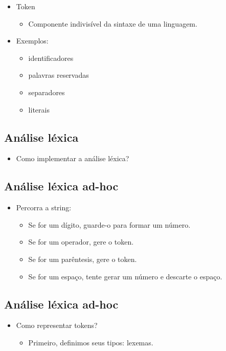 \documentclass[11pt]{article}
\begin{document}
\begin{itemize}
\item Token
\begin{itemize}
\item Componente indivisível da sintaxe de uma linguagem.
\end{itemize}
\item Exemplos:
\begin{itemize}
\item identificadores
\item palavras reservadas
\item separadores
\item literais
\end{itemize}
\end{itemize}
\subsection*{Análise léxica}
\label{sec:org859965b}

\begin{itemize}
\item Como implementar a análise léxica?
\end{itemize}
\subsection*{Análise léxica ad-hoc}
\label{sec:orgcb0e5e0}

\begin{itemize}
\item Percorra a string:
\begin{itemize}
\item Se for um dígito, guarde-o para formar um número.
\item Se for um operador, gere o token.
\item Se for um parêntesis, gere o token.
\item Se for um espaço, tente gerar um número e descarte o espaço.
\end{itemize}
\end{itemize}
\subsection*{Análise léxica ad-hoc}
\label{sec:org9bb3f92}

\begin{itemize}
\item Como representar tokens?
\begin{itemize}
\item Primeiro, definimos seus tipos: lexemas.
\end{itemize}
\end{itemize}
\end{document}
